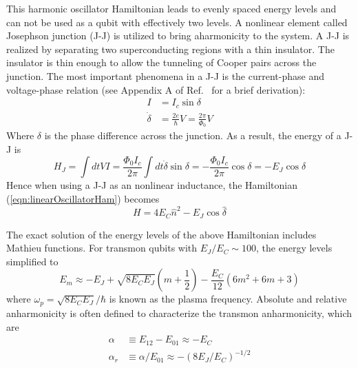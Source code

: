 \documentclass[%
groupedaddress,
showpacs,
 amsmath,amssymb,
 aps,
prb,
]{revtex4-1}
\begin{document}
    This harmonic oscillator Hamiltonian leads to evenly spaced energy levels and can not be used as a qubit with effectively two levels. A nonlinear element called Josephson junction (J-J) is utilized to bring aharmonicity to the system. A J-J is realized by separating two superconducting regions with a thin insulator. The insulator is thin enough to allow the tunneling of Cooper pairs across the junction. The most important phenomena in a J-J is the current-phase and voltage-phase relation (see Appendix A of Ref.~ for a brief derivation):
    \begin{align}
    \label{eqn:currentVoltagePhase}
        I &= I_c \sin \delta \\
        \dot \delta & = \frac{2e}{\hbar} V = \frac{2 \pi}{\Phi_0} V
    \end{align}
    Where $ \delta $ is the phase difference across the junction. As a result, the energy of a J-J is\cite{Raab2015}
    \begin{equation}
        H_J = \int dt VI = \frac{\Phi_0 I_c}{2 \pi}\int dt \dot \delta \sin \delta = -\frac{\Phi_0 I_c}{2 \pi}\cos \delta = -E_J \cos \delta
    \end{equation}
    Hence when using a J-J as an nonlinear inductance, the Hamiltonian (\ref{eqn:linearOscillatorHam}) becomes
    \begin{equation}
        H = 4E_C \hat n^2 -E_J \cos \hat \delta  
    \end{equation}

    The exact solution of the energy levels of the above Hamiltonian includes Mathieu functions\cite{schuster2007circuit,koch2007charge}. For transmon qubits with $E_J /E_C \sim 100$, the energy levels simplified to\cite{koch2007charge}
    \begin{equation}
    \label{eqn:transmonLevels}
        E_m \approx -E_J + \sqrt{8E_CE_J} \left (m+\frac{1}{2} \right ) - \frac{E_C}{12}(6m^2+6m+3)
    \end{equation}
    where $ \omega_p = \sqrt{8E_CE_J}/\hbar   $ is known as the plasma frequency. Absolute and relative anharmonicity is often defined to characterize the transmon anharmonicity, which are
    \begin{align}
        \alpha &\equiv E_{12} - E_{01} \approx -E_C\\
        \alpha_r & \equiv \alpha/E_{01} \approx -(8E_J/E_C)^{-1/2}
    \end{align}
    
\end{document}
